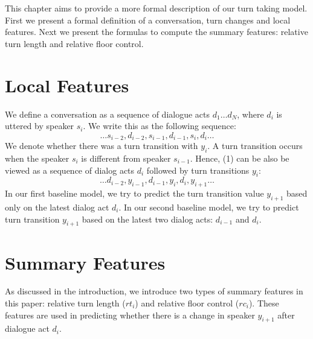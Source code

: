 This chapter aims to provide a more formal description of our turn taking model. First we present a formal definition of a conversation, turn changes and local features. Next we present the formulas to compute the summary features: relative turn length and relative floor control.

\section{Local Features}

     We define a conversation as a sequence of dialogue acts $d_1 \dots d_N$, where $d_i$ is uttered by speaker $s_i$.  We write this as the following sequence:
%
     \begin{equation}
       \ldots  s_{i-2}, d_{i-2}, s_{i-1} , d_{i-1}, s_i, d_i  \ldots
     \end{equation}
     We denote whether there was a turn transition with $y_i$. A turn transition occurs when the speaker $s_i$ is different from speaker $s_{i-1}$. Hence, (1) can be also be viewed as a sequence of dialog acts $d_i$ followed by turn transitions $y_i$:
%
     \begin{equation}
       \ldots    d_{i-2}, y_{i-1}, d_{i-1}, y_{i} , d_i, y_{i+1} \ldots
     \end{equation}
      In our first baseline model, we try to predict the turn transition value $y_{i+1}$ based only on the latest dialog act $d_i$. In our second baseline model, we try to predict turn transition $y_{i+1}$ based on the latest two dialog acts: $d_{i-1}$ and $d_i$.


\section{Summary Features}\label{sfeatures}

     As discussed in the introduction, we introduce two types of summary features in this paper: relative turn length ($rt_i$) and relative floor control ($rc_i$).  These features are used in predicting whether there is a change in speaker $y_{i+1}$ after dialogue act $d_i$.

